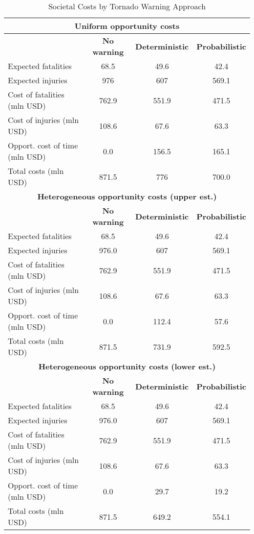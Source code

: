 
\begin{table}[!htbp]
\caption{Societal Costs by Tornado Warning Approach}
\label{dirbenefits}
\centering
\begin{tabular}{lccc}
\hline
\multicolumn{4}{c}{\textbf{Uniform opportunity costs}} \\
\hline 
 & \textbf{No warning} & \textbf{Deterministic} & \textbf{Probabilistic}\\

\hline 
Expected fatalities & 68.5 & 49.6 & 42.4  \\ 
Expected injuries   & 976 & 607  & 569.1  \\ 
Cost of fatalities (mln USD)  & 762.9 & 551.9 & 471.5 \\
Cost of injuries  (mln USD)  & 108.6 & 67.6 & 63.3 \\
Opport. cost of time  (mln USD)  & 0.0 & 156.5 & 165.1  \\
Total costs (mln USD)  & 871.5 & 776  & 700.0 \\
\hline
\multicolumn{4}{c}{\textbf{Heterogeneous opportunity costs (upper est.)}} \\
\hline 
 & \textbf{No warning} & \textbf{Deterministic} & \textbf{Probabilistic} \\
\hline
Expected fatalities & 68.5  & 49.6 & 42.4 \\ 
Expected injuries   & 976.0  & 607 & 569.1  \\ 
Cost of fatalities (mln USD)  & 762.9  & 551.9 & 471.5\\
Cost of injuries  (mln USD)  & 108.6  & 67.6 & 63.3\\
Opport. cost of time  (mln USD)  & 0.0   & 112.4 & 57.6 \\
Total costs (mln USD)  & 871.5  & 731.9 & 592.5 \\
\hline
\multicolumn{4}{c}{\textbf{Heterogeneous opportunity costs (lower est.)}} \\
\hline 
 & \textbf{No warning} & \textbf{Deterministic} & \textbf{Probabilistic} \\
\hline
Expected fatalities & 68.5  & 49.6 & 42.4 \\ 
Expected injuries   & 976.0  & 607 & 569.1  \\ 
Cost of fatalities (mln USD)  & 762.9  & 551.9 & 471.5\\
Cost of injuries  (mln USD)  & 108.6  & 67.6 & 63.3\\
Opport. cost of time  (mln USD)  & 0.0   & 29.7 & 19.2 \\
Total costs (mln USD)  & 871.5  & 649.2 & 554.1 \\
\hline
\end{tabular}
\end{table}